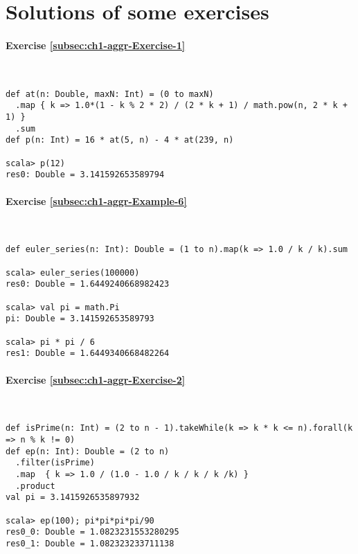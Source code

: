 \chapter{Solutions of some exercises}


\subsubsection*{Exercise \ref{subsec:ch1-aggr-Exercise-1}}

~
\begin{lstlisting}
def at(n: Double, maxN: Int) = (0 to maxN)
  .map { k => 1.0*(1 - k % 2 * 2) / (2 * k + 1) / math.pow(n, 2 * k + 1) }
  .sum
def p(n: Int) = 16 * at(5, n) - 4 * at(239, n)

scala> p(12)
res0: Double = 3.141592653589794
\end{lstlisting}


\subsubsection*{Exercise \ref{subsec:ch1-aggr-Example-6}}

~

\begin{lstlisting}
def euler_series(n: Int): Double = (1 to n).map(k => 1.0 / k / k).sum

scala> euler_series(100000)
res0: Double = 1.6449240668982423

scala> val pi = math.Pi
pi: Double = 3.141592653589793

scala> pi * pi / 6
res1: Double = 1.6449340668482264 
\end{lstlisting}


\subsubsection*{Exercise \ref{subsec:ch1-aggr-Exercise-2}}

~
\begin{lstlisting}
def isPrime(n: Int) = (2 to n - 1).takeWhile(k => k * k <= n).forall(k => n % k != 0)
def ep(n: Int): Double = (2 to n)
  .filter(isPrime)
  .map  { k => 1.0 / (1.0 - 1.0 / k / k / k /k) }
  .product
val pi = 3.1415926535897932

scala> ep(100); pi*pi*pi*pi/90
res0_0: Double = 1.0823231553280295
res0_1: Double = 1.082323233711138 
\end{lstlisting}


